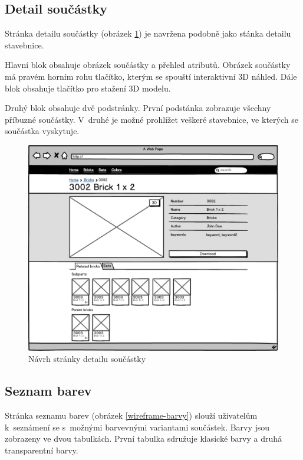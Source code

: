 \subsection{Detail součástky}
Stránka detailu součástky (obrázek \ref{wireframe-soucastka-detail}) je navržena podobně jako stánka detailu stavebnice. 

Hlavní blok obsahuje obrázek součástky a přehled atributů. Obrázek součástky má pravém horním rohu tlačítko, kterým se spouští interaktivní 3D náhled. Dále blok obsahuje tlačítko pro stažení 3D modelu. 

Druhý blok obsahuje dvě podstránky. První podstánka zobrazuje všechny příbuzné součástky. V~druhé je možné prohlížet veškeré stavebnice, ve kterých se součástka vyskytuje.

\begin{figure}[htbp]
    \centering
    \includegraphics[width=\textwidth,height=\textheight,keepaspectratio]{pdfs/wireframe_brick.pdf}
    \caption{Návrh stránky detailu součástky}\label{wireframe-soucastka-detail}
\end{figure}

\subsection{Seznam barev}
Stránka seznamu barev (obrázek \ref{wireframe-barvy}) slouží uživatelům k~seznámení se s~možnými barvevnými variantami součástek. Barvy jsou zobrazeny ve dvou tabulkách. První tabulka sdružuje klasické barvy a druhá transparentní barvy. 

